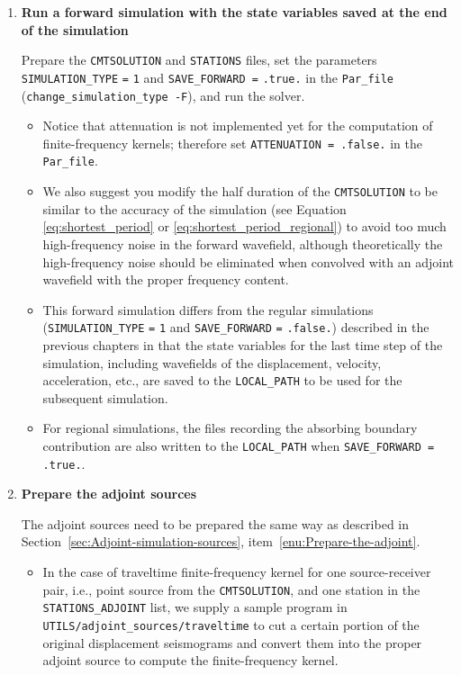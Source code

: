 \documentclass[oneside,english]{book}
\begin{document}
\begin{enumerate}
\item \textbf{Run a forward simulation with the state variables saved at
the end of the simulation}


Prepare the \texttt{\small CMTSOLUTION} and \texttt{\small STATIONS}
files, set the parameters \texttt{\small SIMULATION\_TYPE}{\small{}
}\texttt{\small =}{\small{} }\texttt{\small 1} and \texttt{\small SAVE\_FORWARD
=}{\small{} }\texttt{\small .true.} in the \texttt{Par\_file} (\texttt{change\_simulation\_type
-F}), and run the solver.

\begin{itemize}
\item Notice that attenuation is not implemented yet for the computation
of finite-frequency kernels; therefore set \texttt{ATTENUATION = .false.}
in the \texttt{Par\_file}.
\item We also suggest you modify the half duration of the \texttt{CMTSOLUTION}
to be similar to the accuracy of the simulation (see Equation \ref{eq:shortest_period}
or \ref{eq:shortest_period_regional}) to avoid too much high-frequency
noise in the forward wavefield, although theoretically the high-frequency
noise should be eliminated when convolved with an adjoint wavefield
with the proper frequency content.
\item This forward simulation differs from the regular simulations (\texttt{\small SIMULATION\_TYPE}{\small{}
}\texttt{\small =}{\small{} }\texttt{\small 1} and \texttt{\small SAVE\_FORWARD}{\small{}
}\texttt{\small =}{\small{} }\texttt{\small .false.}) described in
the previous chapters in that the state variables for the last time
step of the simulation, including wavefields of the displacement,
velocity, acceleration, etc., are saved to the \texttt{LOCAL\_PATH}
to be used for the subsequent simulation.
\item For regional simulations, the files recording the absorbing boundary
contribution are also written to the \texttt{LOCAL\_PATH} when \texttt{SAVE\_FORWARD
= .true.}.
\end{itemize}
\item \textbf{Prepare the adjoint sources}


The adjoint sources need to be prepared the same way as described
in Section~\ref{sec:Adjoint-simulation-sources}, item~\ref{enu:Prepare-the-adjoint}.

\begin{itemize}
\item In the case of traveltime finite-frequency kernel for one source-receiver
pair, i.e., point source from the \texttt{CMTSOLUTION}, and one station
in the \texttt{STATIONS\_ADJOINT} list, we supply a sample program
in \texttt{UTILS/adjoint\_sources/traveltime} to cut a certain portion of the original
displacement seismograms and convert them into the proper adjoint
source to compute the finite-frequency kernel.


\end{itemize}
\end{enumerate}
\end{document}
